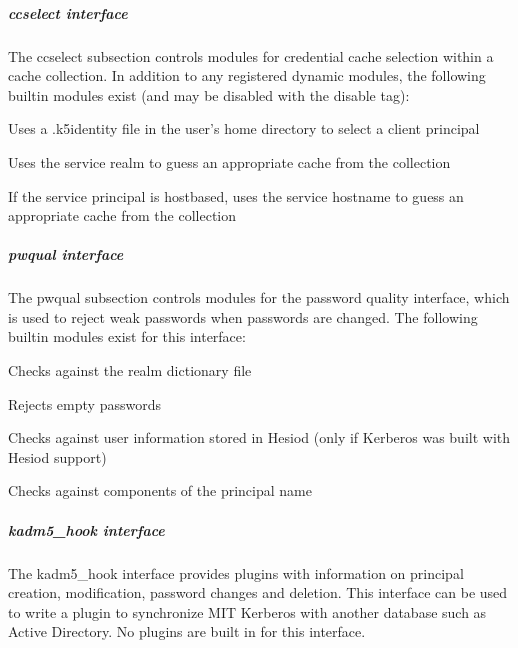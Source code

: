 \documentclass[letterpaper,10pt,english]{sphinxmanual}
\begin{document}
\subparagraph{ccselect interface}
\label{\detokenize{admin/conf_files/krb5_conf:ccselect-interface}}\label{\detokenize{admin/conf_files/krb5_conf:ccselect}}
\sphinxAtStartPar
The ccselect subsection controls modules for credential cache
selection within a cache collection.  In addition to any registered
dynamic modules, the following built\sphinxhyphen{}in modules exist (and may be
disabled with the disable tag):
\begin{description}
\sphinxAtStartPar
Uses a .k5identity file in the user’s home directory to select a
client principal

\sphinxAtStartPar
Uses the service realm to guess an appropriate cache from the
collection

\sphinxAtStartPar
If the service principal is host\sphinxhyphen{}based, uses the service hostname
to guess an appropriate cache from the collection

\end{description}


\subparagraph{pwqual interface}
\label{\detokenize{admin/conf_files/krb5_conf:pwqual-interface}}\label{\detokenize{admin/conf_files/krb5_conf:pwqual}}
\sphinxAtStartPar
The pwqual subsection controls modules for the password quality
interface, which is used to reject weak passwords when passwords are
changed.  The following built\sphinxhyphen{}in modules exist for this interface:
\begin{description}
\sphinxAtStartPar
Checks against the realm dictionary file

\sphinxAtStartPar
Rejects empty passwords

\sphinxAtStartPar
Checks against user information stored in Hesiod (only if Kerberos
was built with Hesiod support)

\sphinxAtStartPar
Checks against components of the principal name

\end{description}


\subparagraph{kadm5\_hook interface}
\label{\detokenize{admin/conf_files/krb5_conf:kadm5-hook-interface}}\label{\detokenize{admin/conf_files/krb5_conf:kadm5-hook}}
\sphinxAtStartPar
The kadm5\_hook interface provides plugins with information on
principal creation, modification, password changes and deletion.  This
interface can be used to write a plugin to synchronize MIT Kerberos
with another database such as Active Directory.  No plugins are built
in for this interface.
\end{document}
